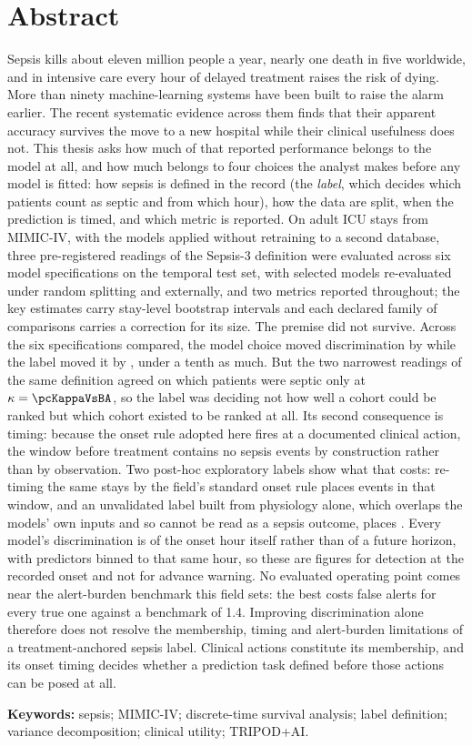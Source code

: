 \chapter*{Abstract}

Sepsis kills about eleven million people a year, nearly one death in five
worldwide, and in intensive care every hour of delayed treatment raises the
risk of dying. More than ninety machine-learning systems have been built to
raise the alarm earlier. The recent systematic evidence across them finds that
their apparent accuracy survives the move to a new hospital while their
clinical usefulness does not. This thesis asks how much of that reported
performance belongs to the model at all, and how much belongs to four choices
the analyst makes before any model is fitted: how sepsis is defined in the
record (the \emph{label}, which decides which patients count as septic and from
which hour), how the data are split, when the prediction is timed, and which
metric is reported. On \pcNStays{} adult ICU stays from MIMIC-IV, with the
models applied without retraining to a second database, three pre-registered
readings of the Sepsis-3 definition were evaluated across six model
specifications on the temporal test set, with selected models re-evaluated
under random splitting and externally, and two metrics reported throughout; the
key estimates carry stay-level bootstrap intervals and each declared family of
comparisons carries a correction for its size. The premise did
not survive. Across the six specifications compared, the model choice moved
discrimination by \pcSpreadModelClass{} while the label moved it by
\pcSpreadLabel, under a tenth as much. But the two narrowest readings of
the same definition agreed on which patients were septic only at
$\kappa = \pcKappaVsBA$, so the label was deciding not how well a cohort could
be ranked but which cohort existed to be ranked at all. Its second consequence
is timing: because the onset rule adopted here fires at a documented clinical
action, the window before treatment contains no sepsis events by construction
rather than by observation. Two post-hoc exploratory labels show what that
costs: re-timing the same stays by the field's standard onset rule places
\pcPreTreatOnsetsVarF{} events in that window, and an unvalidated label built
from physiology alone, which overlaps the models' own inputs and so cannot be
read as a sepsis outcome, places \pcPreTreatOnsetsVarD. Every model's
discrimination is of the onset hour itself rather than of a future horizon, with
predictors binned to that same hour, so these are figures for detection at the
recorded onset and not for advance warning.
No evaluated operating point comes near the alert-burden benchmark this field
sets: the best costs \pcUtilityOptBurdenGbtB{} false alerts for every true one
against a benchmark of 1.4. Improving discrimination alone therefore does not
resolve the membership, timing and alert-burden limitations of a
treatment-anchored sepsis label. Clinical actions constitute its membership,
and its onset timing decides whether a prediction task defined before those
actions can be posed at all.

\vspace{0.4em}
\noindent\textbf{Keywords:} sepsis; MIMIC-IV; discrete-time survival analysis;
label definition; variance decomposition; clinical utility; TRIPOD+AI.
